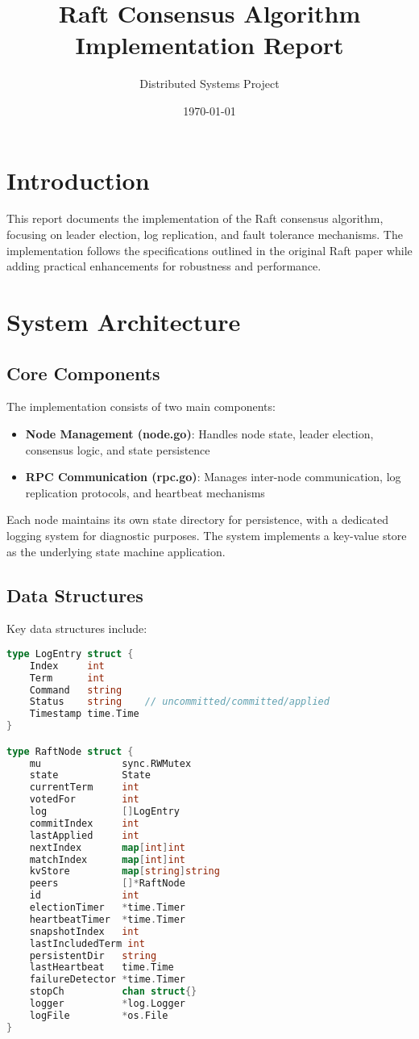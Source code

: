 \documentclass{article}
\title{Raft Consensus Algorithm Implementation Report}
\author{Distributed Systems Project}
\date{\today}
\begin{document}
\maketitle

\section{Introduction}
This report documents the implementation of the Raft consensus algorithm, focusing on leader election, log replication, and fault tolerance mechanisms. The implementation follows the specifications outlined in the original Raft paper while adding practical enhancements for robustness and performance.

\section{System Architecture}

\subsection{Core Components}
The implementation consists of two main components:
\begin{itemize}
    \item \textbf{Node Management (node.go)}: Handles node state, leader election, consensus logic, and state persistence
    \item \textbf{RPC Communication (rpc.go)}: Manages inter-node communication, log replication protocols, and heartbeat mechanisms
\end{itemize}

Each node maintains its own state directory for persistence, with a dedicated logging system for diagnostic purposes. The system implements a key-value store as the underlying state machine application.

\subsection{Data Structures}
Key data structures include:
\begin{lstlisting}[language=Go]
type LogEntry struct {
    Index     int
    Term      int
    Command   string
    Status    string    // uncommitted/committed/applied
    Timestamp time.Time
}

type RaftNode struct {
    mu              sync.RWMutex
    state           State
    currentTerm     int
    votedFor        int
    log             []LogEntry
    commitIndex     int
    lastApplied     int
    nextIndex       map[int]int
    matchIndex      map[int]int
    kvStore         map[string]string
    peers           []*RaftNode
    id              int
    electionTimer   *time.Timer
    heartbeatTimer  *time.Timer
    snapshotIndex   int
    lastIncludedTerm int
    persistentDir   string
    lastHeartbeat   time.Time
    failureDetector *time.Timer
    stopCh          chan struct{}
    logger          *log.Logger
    logFile         *os.File
}
\end{lstlisting}
\end{document}
